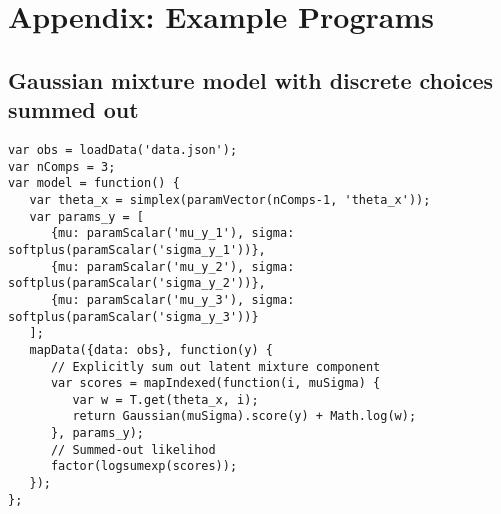 \section{Appendix: Example Programs}
\label{sec:appendix_code}

\subsection{Gaussian mixture model with discrete choices summed out}
\label{sec:appendix_code:gmmSumOut}

\begin{lstlisting}
var obs = loadData('data.json');
var nComps = 3;
var model = function() {
   var theta_x = simplex(paramVector(nComps-1, 'theta_x'));
   var params_y = [
      {mu: paramScalar('mu_y_1'), sigma: softplus(paramScalar('sigma_y_1'))},
      {mu: paramScalar('mu_y_2'), sigma: softplus(paramScalar('sigma_y_2'))},
      {mu: paramScalar('mu_y_3'), sigma: softplus(paramScalar('sigma_y_3'))}
   ];
   mapData({data: obs}, function(y) {
      // Explicitly sum out latent mixture component
      var scores = mapIndexed(function(i, muSigma) {
         var w = T.get(theta_x, i);
         return Gaussian(muSigma).score(y) + Math.log(w);
      }, params_y);
      // Summed-out likelihod
      factor(logsumexp(scores));
   });
};
\end{lstlisting}
